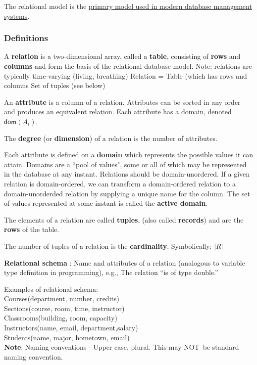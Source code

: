 \documentclass{article}
\begin{document}
\noindent The relational model is the \underline{primary model used in modern database management systems}.


\subsubsection*{Definitions}
\begin{outline}
        \1 A \textbf{relation} is a two-dimensional array, called a \textbf{table},
consisting of \textbf{rows} and \textbf{columns} and form the basis of the
relational database model.  Note: relations are typically time-varying (living, breathing)
        \2 Relation =  Table (which has rows and columns\2 Set of tuples (see below)
        
        
        \1  An \textbf{attribute} is a column of a relation.  Attributes can be sorted in any order and produces an equivalent relation.
        \2 Each attribute has a domain, denoted $\textsf{dom}(A_i)$. 

        \1   The \textbf{degree} (or \textbf{dimension}) of a relation is the number of attributes.  


        \1  Each attribute is defined on a \textbf{domain} which represents the possible values it can attain.  Domains are a ``pool of values", some or all of which may be represented in the database at any instant.  Relations should be domain-unordered.  If a given relation is domain-ordered, we can transform a domain-ordered relation to a domain-unorderded relation by supplying a unique name for the column.   
                \2 The set of values represented at some instant is called the \textbf{active domain}.   

        \1 The elements of a relation are called \textbf{tuples}, (also called  \textbf{records}) and are the \textbf{rows} of the table.

        \1  The number of tuples of a relation is the \textbf{cardinality}.
                \2 Symbolically: $|R|$
        
        \1 \textbf{Relational schema }: Name and attributes of a relation (analogous to variable type definition in programming), e.g., The relation ``is of type double.''  

Examples of relational schema: \\ 
  \textsf{Courses(department, number, credits)}\\
 \textsf{Sections(course, room, time, instructor)}\\
 \textsf{Classrooms(building, room, capacity)}\\
 \textsf{Instructors(name, email, department,salary)}\\
 \textsf{Students(name, major, hometown, email)}\\
 
 
        
        \textbf{Note}: Naming conventions - Upper case, plural.  This may NOT\ be standard naming convention. 
      
\end{outline}
\end{document}
